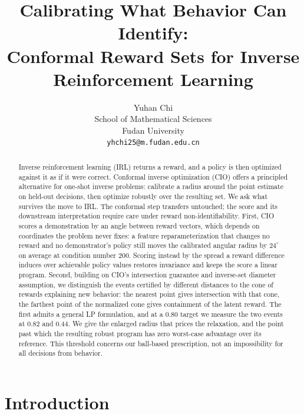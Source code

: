 \documentclass{article}
\title{Calibrating What Behavior Can Identify:\\
Conformal Reward Sets for Inverse Reinforcement Learning}
\author{%
  Yuhan Chi \\
  School of Mathematical Sciences \\
  Fudan University \\
  \texttt{yhchi25@m.fudan.edu.cn} \\
}
\begin{document}
\maketitle

\begin{abstract}
Inverse reinforcement learning (IRL) returns a reward, and a policy is then
optimized against it as if it were correct. Conformal inverse optimization
(CIO) offers a principled alternative for one-shot inverse problems: calibrate
a radius around the point estimate on held-out decisions, then optimize
robustly over the resulting set. We ask what survives the move to IRL. The
conformal step transfers untouched; the score and its downstream interpretation
require care under reward non-identifiability. First, CIO scores a demonstration
by an angle between reward vectors, which depends on coordinates the problem
never fixes: a feature reparameterization
that changes no reward and no demonstrator's policy still moves the calibrated
angular radius by $24^\circ$ on average at condition number $200$. Scoring instead
by the spread a reward difference induces over achievable policy values restores invariance and keeps
the score a linear program. Second, building on CIO's intersection guarantee
and inverse-set diameter assumption, we distinguish the events certified
by different distances to the cone of rewards explaining new behavior: the
nearest point gives intersection with that cone, the farthest point of the
normalized cone gives containment of the latent reward. The first admits a
general LP formulation, and at a $0.80$ target we measure the two events at $0.82$ and
$0.44$. We give the enlarged radius that
prices the relaxation, and the point past which the resulting robust program
has zero worst-case advantage over its reference. This threshold concerns our
ball-based prescription, not an impossibility for all decisions from behavior.
\end{abstract}

\section{Introduction}
\end{document}
